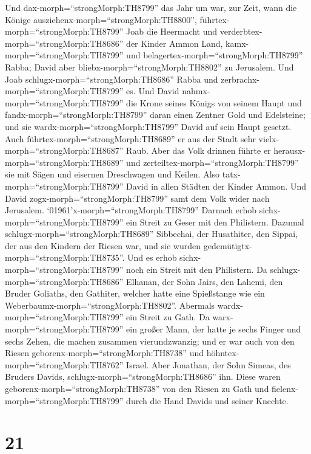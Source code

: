  Und dax-morph=``strongMorph:TH8799'' das Jahr um war, zur
Zeit, wann die Könige ausziehenx-morph=``strongMorph:TH8800'',
führtex-morph=``strongMorph:TH8799'' Joab die Heermacht und
verderbtex-morph=``strongMorph:TH8686'' der Kinder Ammon Land,
kamx-morph=``strongMorph:TH8799'' und
belagertex-morph=``strongMorph:TH8799'' Rabba; David aber
bliebx-morph=``strongMorph:TH8802'' zu Jerusalem. Und Joab
schlugx-morph=``strongMorph:TH8686'' Rabba und
zerbrachx-morph=``strongMorph:TH8799'' es.  Und David
nahmx-morph=``strongMorph:TH8799'' die Krone seines Königs von seinem
Haupt und fandx-morph=``strongMorph:TH8799'' daran einen Zentner Gold
und Edelsteine; und sie wardx-morph=``strongMorph:TH8799'' David auf
sein Haupt gesetzt. Auch führtex-morph=``strongMorph:TH8689'' er aus der
Stadt sehr vielx-morph=``strongMorph:TH8687'' Raub.  Aber
das Volk drinnen führte er herausx-morph=``strongMorph:TH8689'' und
zerteiltex-morph=``strongMorph:TH8799'' sie mit Sägen und eisernen
Dreschwagen und Keilen. Also tatx-morph=``strongMorph:TH8799'' David in
allen Städten der Kinder Ammon. Und David
zogx-morph=``strongMorph:TH8799'' samt dem Volk wider nach Jerusalem.
 `01961'\textbar x-morph=``strongMorph:TH8799'' Darnach
erhob sichx-morph=``strongMorph:TH8799'' ein Streit zu Geser mit den
Philistern. Dazumal schlugx-morph=``strongMorph:TH8689'' Sibbechai, der
Husathiter, den Sippai, der aus den Kindern der Riesen war, und sie
wurden gedemütigtx-morph=``strongMorph:TH8735''.  Und es
erhob sichx-morph=``strongMorph:TH8799'' noch ein Streit mit den
Philistern. Da schlugx-morph=``strongMorph:TH8686'' Elhanan, der Sohn
Jairs, den Lahemi, den Bruder Goliaths, den Gathiter, welcher hatte eine
Spießstange wie ein Weberbaumx-morph=``strongMorph:TH8802''.
 Abermals wardx-morph=``strongMorph:TH8799'' ein Streit zu
Gath. Da warx-morph=``strongMorph:TH8799'' ein großer Mann, der hatte je
sechs Finger und sechs Zehen, die machen zusammen vierundzwanzig; und er
war auch von den Riesen geborenx-morph=``strongMorph:TH8738''
 und höhntex-morph=``strongMorph:TH8762'' Israel. Aber
Jonathan, der Sohn Simeas, des Bruders Davids,
schlugx-morph=``strongMorph:TH8686'' ihn.  Diese waren
geborenx-morph=``strongMorph:TH8738'' von den Riesen zu Gath und
fielenx-morph=``strongMorph:TH8799'' durch die Hand Davids und seiner
Knechte.

\hypertarget{section-20}{%
\section{21}\label{section-20}}

